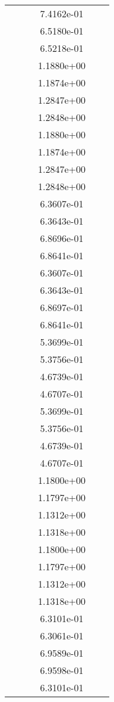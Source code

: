 \begin{xltabular}{\textwidth}{r|rS[table-format=1.3e+2]S[table-format=1.4e+2]S[table-format=1.4e+2]S[table-format=-1.5]}
&  &  & 7.4162e-01 & & \\
&  &  & 6.5180e-01 & & \\
&  &  & 6.5218e-01 & & \\
&  &  & 1.1880e+00 & & \\
&  &  & 1.1874e+00 & & \\
&  &  & 1.2847e+00 & & \\
&  &  & 1.2848e+00 & & \\
&  &  & 1.1880e+00 & & \\
&  &  & 1.1874e+00 & & \\
&  &  & 1.2847e+00 & & \\
&  &  & 1.2848e+00 & & \\
&  &  & 6.3607e-01 & & \\
&  &  & 6.3643e-01 & & \\
&  &  & 6.8696e-01 & & \\
&  &  & 6.8641e-01 & & \\
&  &  & 6.3607e-01 & & \\
&  &  & 6.3643e-01 & & \\
&  &  & 6.8697e-01 & & \\
&  &  & 6.8641e-01 & & \\
&  &  & 5.3699e-01 & & \\
&  &  & 5.3756e-01 & & \\
&  &  & 4.6739e-01 & & \\
&  &  & 4.6707e-01 & & \\
&  &  & 5.3699e-01 & & \\
&  &  & 5.3756e-01 & & \\
&  &  & 4.6739e-01 & & \\
&  &  & 4.6707e-01 & & \\
&  &  & 1.1800e+00 & & \\
&  &  & 1.1797e+00 & & \\
&  &  & 1.1312e+00 & & \\
&  &  & 1.1318e+00 & & \\
&  &  & 1.1800e+00 & & \\
&  &  & 1.1797e+00 & & \\
&  &  & 1.1312e+00 & & \\
&  &  & 1.1318e+00 & & \\
&  &  & 6.3101e-01 & & \\
&  &  & 6.3061e-01 & & \\
&  &  & 6.9589e-01 & & \\
&  &  & 6.9598e-01 & & \\
&  &  & 6.3101e-01 & & \\

\end{xltabular}
